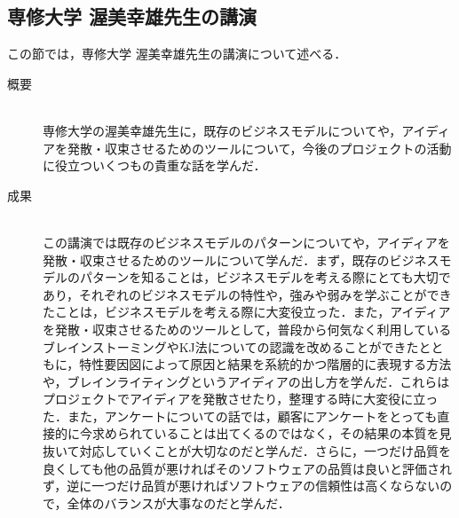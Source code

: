 \subsection{専修大学 渥美幸雄先生の講演}
\par
この節では，専修大学 渥美幸雄先生の講演について述べる．

\begin{description}
 \item[概要]\mbox{}\\
        専修大学の渥美幸雄先生に，既存のビジネスモデルについてや，アイディアを発散・収束させるためのツールについて，今後のプロジェクトの活動に役立ついくつもの貴重な話を学んだ．
 \item[成果]\mbox{}\\ 
        この講演では既存のビジネスモデルのパターンについてや，アイディアを発散・収束させるためのツールについて学んだ．まず，既存のビジネスモデルのパターンを知ることは，ビジネスモデルを考える際にとても大切であり，それぞれのビジネスモデルの特性や，強みや弱みを学ぶことができたことは，ビジネスモデルを考える際に大変役立った．また，アイディアを発散・収束させるためのツールとして，普段から何気なく利用しているブレインストーミングやKJ法についての認識を改めることができたとともに，特性要因図によって原因と結果を系統的かつ階層的に表現する方法や，ブレインライティングというアイディアの出し方を学んだ．これらはプロジェクトでアイディアを発散させたり，整理する時に大変役に立った．また，アンケートについての話では，顧客にアンケートをとっても直接的に今求められていることは出てくるのではなく，その結果の本質を見抜いて対応していくことが大切なのだと学んだ．さらに，一つだけ品質を良くしても他の品質が悪ければそのソフトウェアの品質は良いと評価されず，逆に一つだけ品質が悪ければソフトウェアの信頼性は高くならないので，全体のバランスが大事なのだと学んだ．
\end{description}
